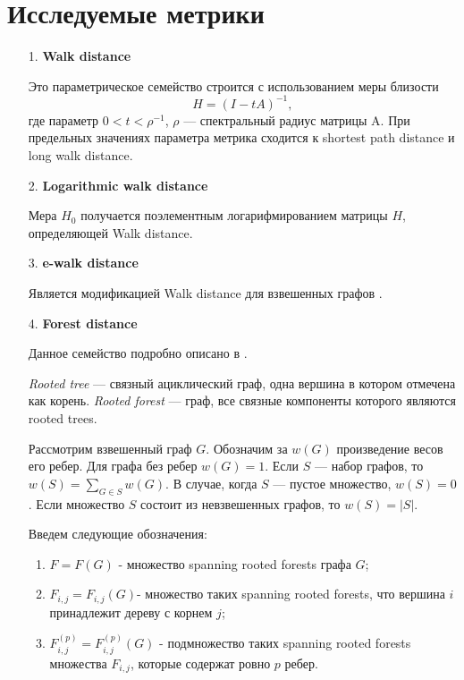 \section{Исследуемые метрики} \label{sect1_3}
\begin{itemize}
\item[1.] \textbf{Walk distance}

Это параметрическое семейство строится с использованием меры близости 
\begin{equation}
H = (I - tA)^{-1},
\end{equation}
где параметр $0 < t < \rho ^{-1}$, $\rho$ --- спектральный радиус матрицы A. При предельных значениях параметра метрика сходится к shortest path distance и long walk distance. 

\item[2.] \textbf{Logarithmic walk distance}

Мера $H_0$ получается поэлементным логарифмированием матрицы $H$, определяющей Walk distance.

\item[3.] \textbf{e-walk distance}

Является модификацией Walk distance для взвешенных графов .

\item[4.] \textbf{Forest distance}

Данное семейство подробно описано в \cite{chebotarev2005duality}.

\emph{Rooted tree} --- связный ациклический граф, одна вершина в котором отмечена как корень. \emph{Rooted forest} --- граф, все связные компоненты которого являются rooted trees.

Рассмотрим взвешенный граф $G$. Обозначим за $w(G)$ произведение весов его ребер. Для графа без ребер $w(G) = 1$. Если $S$ --- набор графов, то $w(S) = \sum\limits_{G \in S} w(G)$.  В случае, когда $S$ --- пустое множество, $w(S) = 0$. Если множество $S$ состоит из невзвешенных графов, то $w(S) = |S|$.

Введем следующие обозначения: 

\begin{enumerate}
\item $F = F(G)$ - множество  spanning rooted forests графа $G$; 
\item $F_{i,j} = F_{i,j}(G)$- множество таких spanning rooted forests, что вершина $i$ принадлежит дереву с корнем $j$; 
\item $F_{i,j}^{(p)} = F_{i,j}^{(p)}(G)$ - подмножество таких spanning rooted forests множества $F_{i,j}$, которые содержат ровно $p$ ребер.
\end{enumerate}


\end{itemize}
